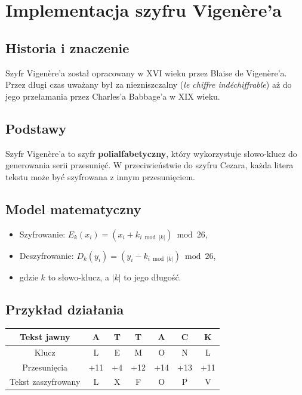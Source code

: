 \documentclass[12pt,a4paper]{article}
\begin{document}
\newpage
\section{Implementacja szyfru Vigenère'a}

\subsection{Historia i znaczenie}
Szyfr Vigenère'a został opracowany w XVI wieku przez Blaise de Vigenère'a. 
Przez długi czas uważany był za niezniszczalny (\textit{le chiffre indéchiffrable}) 
aż do jego przełamania przez Charles'a Babbage'a w XIX wieku.

\subsection{Podstawy}
Szyfr Vigenère'a to szyfr \textbf{polialfabetyczny}, który wykorzystuje słowo-klucz 
do generowania serii przesunięć. W przeciwieństwie do szyfru Cezara, 
każda litera tekstu może być szyfrowana z innym przesunięciem.

\subsection{Model matematyczny}
\begin{itemize}
    \item Szyfrowanie: $E_{k}(x_i) = (x_i + k_{i \bmod |k|}) \bmod 26$,
    \item Deszyfrowanie: $D_{k}(y_i) = (y_i - k_{i \bmod |k|}) \bmod 26$,
    \item gdzie $k$ to słowo-klucz, a $|k|$ to jego długość.
\end{itemize}

\subsection{Przykład działania}
\begin{center}
\begin{tabular}{|c|c|c|c|c|c|c|}
\hline
Tekst jawny & A & T & T & A & C & K \\
\hline
Klucz & L & E & M & O & N & L \\
\hline
Przesunięcia & +11 & +4 & +12 & +14 & +13 & +11 \\
\hline
Tekst zaszyfrowany & L & X & F & O & P & V \\
\hline
\end{tabular}
\end{center}
\end{document}
